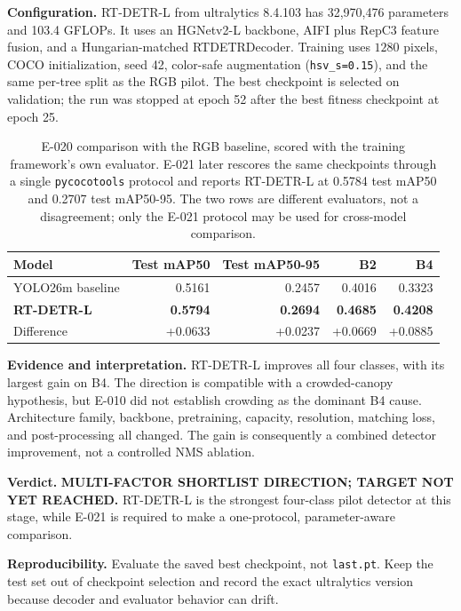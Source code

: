 \documentclass[preprint,12pt]{elsarticle}
\begin{document}
\textbf{Configuration.} RT-DETR-L from ultralytics 8.4.103 has 32,970,476
parameters and 103.4 GFLOPs. It uses an HGNetv2-L backbone, AIFI plus RepC3
feature fusion, and a Hungarian-matched RTDETRDecoder. Training uses \(1280\)
pixels, COCO initialization, seed 42, color-safe augmentation
(\texttt{hsv\_s=0.15}), and the same per-tree split as the RGB pilot. The best
checkpoint is selected on validation; the run was stopped at epoch 52 after
the best fitness checkpoint at epoch 25.

\begin{table}[H]
\centering
\caption{E-020 comparison with the RGB baseline, scored with the training
framework's own evaluator. E-021 later rescores the same checkpoints through a
single \texttt{pycocotools} protocol and reports RT-DETR-L at 0.5784 test mAP50
and 0.2707 test mAP50-95. The two rows are different evaluators, not a
disagreement; only the E-021 protocol may be used for cross-model comparison.}
\label{tab:e020}
\begin{tabular}{lrrrr}
\toprule
Model & Test mAP50 & Test mAP50-95 & B2 & B4\\
\midrule
YOLO26m baseline & 0.5161 & 0.2457 & 0.4016 & 0.3323\\
\textbf{RT-DETR-L} & \textbf{0.5794} & \textbf{0.2694} & \textbf{0.4685} &
\textbf{0.4208}\\
Difference & +0.0633 & +0.0237 & +0.0669 & +0.0885\\
\bottomrule
\end{tabular}
\end{table}

\textbf{Evidence and interpretation.} RT-DETR-L improves all four classes,
with its largest gain on B4. The direction is compatible with a
crowded-canopy hypothesis, but E-010 did not establish crowding as the
dominant B4 cause. Architecture family, backbone, pretraining,
capacity, resolution, matching loss, and post-processing all changed. The
gain is consequently a combined detector improvement, not a controlled NMS
ablation.

\textbf{Verdict.} \textbf{MULTI-FACTOR SHORTLIST DIRECTION; TARGET NOT YET
REACHED.} RT-DETR-L is the strongest four-class pilot detector at this stage,
while E-021 is required to make a one-protocol, parameter-aware comparison.

\textbf{Reproducibility.} Evaluate the saved best checkpoint, not
\texttt{last.pt}. Keep the test set out of checkpoint selection and record
the exact ultralytics version because decoder and evaluator behavior can drift.
\end{document}
